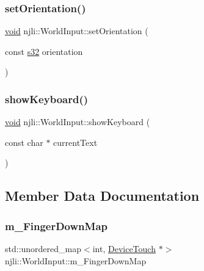 \subsubsection{\texorpdfstring{set\+Orientation()}{setOrientation()}}
{\footnotesize\ttfamily \mbox{\hyperlink{_thread_8h_af1e856da2e658414cb2456cb6f7ebc66}{void}} njli\+::\+World\+Input\+::set\+Orientation (\begin{DoxyParamCaption}\item[{const \mbox{\hyperlink{_util_8h_aa62c75d314a0d1f37f79c4b73b2292e2}{s32}}}]{orientation }\end{DoxyParamCaption})}

\mbox{\label{classnjli_1_1_world_input_a903fab91e0b94cb0be9444b3095d0b28}} 
\subsubsection{\texorpdfstring{show\+Keyboard()}{showKeyboard()}}
{\footnotesize\ttfamily \mbox{\hyperlink{_thread_8h_af1e856da2e658414cb2456cb6f7ebc66}{void}} njli\+::\+World\+Input\+::show\+Keyboard (\begin{DoxyParamCaption}\item[{const char $\ast$}]{current\+Text }\end{DoxyParamCaption})}



\subsection{Member Data Documentation}
\mbox{\label{classnjli_1_1_world_input_ab84a5dd501740fc57be6241b4f3f0167}} 
\subsubsection{\texorpdfstring{m\+\_\+\+Finger\+Down\+Map}{m\_FingerDownMap}}
{\footnotesize\ttfamily std\+::unordered\+\_\+map$<$int, \mbox{\hyperlink{classnjli_1_1_device_touch}{Device\+Touch}} $\ast$$>$ njli\+::\+World\+Input\+::m\+\_\+\+Finger\+Down\+Map\hspace{0.3cm}{\ttfamily [private]}}



